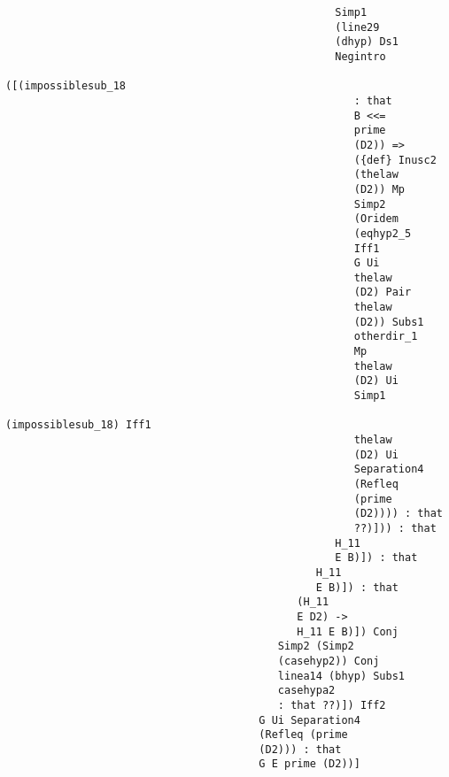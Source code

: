 \documentclass[12pt]{article}
\begin{document}
\begin{verbatim}
                                                    Simp1 
                                                    (line29 
                                                    (dhyp) Ds1 
                                                    Negintro 
                                                    ([(impossiblesub_18 
                                                       : that 
                                                       B <<= 
                                                       prime 
                                                       (D2)) => 
                                                       ({def} Inusc2 
                                                       (thelaw 
                                                       (D2)) Mp 
                                                       Simp2 
                                                       (Oridem 
                                                       (eqhyp2_5 
                                                       Iff1 
                                                       G Ui 
                                                       thelaw 
                                                       (D2) Pair 
                                                       thelaw 
                                                       (D2)) Subs1 
                                                       otherdir_1 
                                                       Mp 
                                                       thelaw 
                                                       (D2) Ui 
                                                       Simp1 
                                                       (impossiblesub_18) Iff1 
                                                       thelaw 
                                                       (D2) Ui 
                                                       Separation4 
                                                       (Refleq 
                                                       (prime 
                                                       (D2)))) : that 
                                                       ??)])) : that 
                                                    H_11 
                                                    E B)]) : that 
                                                 H_11 
                                                 E B)]) : that 
                                              (H_11 
                                              E D2) -> 
                                              H_11 E B)]) Conj 
                                           Simp2 (Simp2 
                                           (casehyp2)) Conj 
                                           linea14 (bhyp) Subs1 
                                           casehypa2 
                                           : that ??)]) Iff2 
                                        G Ui Separation4 
                                        (Refleq (prime 
                                        (D2))) : that 
                                        G E prime (D2))]



\end{verbatim}
\end{document}
